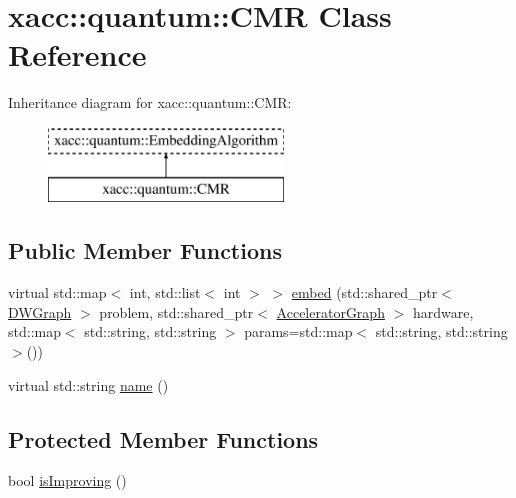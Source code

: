 \hypertarget{a00032}{}\section{xacc\+:\+:quantum\+:\+:C\+MR Class Reference}
\label{a00032}
Inheritance diagram for xacc\+:\+:quantum\+:\+:C\+MR\+:\begin{figure}[H]
\begin{center}
\leavevmode
\includegraphics[height=2.000000cm]{a00032}
\end{center}
\end{figure}
\subsection*{Public Member Functions}
\begin{DoxyCompactItemize}
\item 
virtual std\+::map$<$ int, std\+::list$<$ int $>$ $>$ \hyperlink{a00032_a3408b5b72c426b4733ea4b0a19feb2f4}{embed} (std\+::shared\+\_\+ptr$<$ \hyperlink{a00043}{D\+W\+Graph} $>$ problem, std\+::shared\+\_\+ptr$<$ \hyperlink{a00064}{Accelerator\+Graph} $>$ hardware, std\+::map$<$ std\+::string, std\+::string $>$ params=std\+::map$<$ std\+::string, std\+::string $>$())
\item 
virtual std\+::string \hyperlink{a00032_a06abf96899ccbfb4e2e0b2c72f978854}{name} ()
\end{DoxyCompactItemize}
\subsection*{Protected Member Functions}
\begin{DoxyCompactItemize}
\item 
bool \hyperlink{a00032_a0636b043d3167207f64dc555f536f087}{is\+Improving} ()
\end{DoxyCompactItemize}
